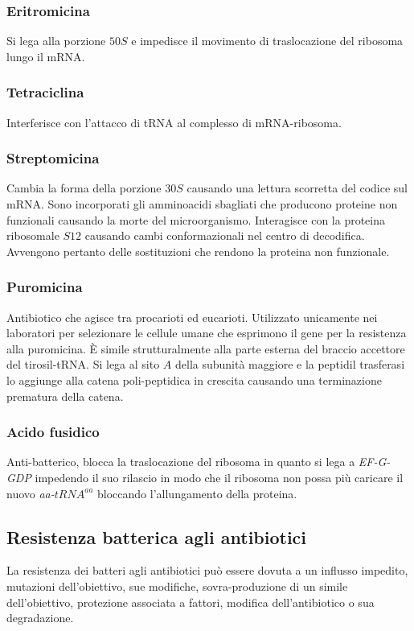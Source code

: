 \subsubsection{Eritromicina}
Si lega alla porzione $50S$ e impedisce il movimento di traslocazione del ribosoma lungo il mRNA.
\subsubsection{Tetraciclina}
Interferisce con l'attacco di tRNA al complesso di mRNA-ribosoma.
\subsubsection{Streptomicina}
Cambia la forma della porzione $30S$ causando una lettura scorretta del codice sul mRNA. Sono incorporati gli amminoacidi sbagliati che producono proteine non funzionali causando la morte
del microorganismo. Interagisce con la proteina ribosomale $S12$ causando cambi conformazionali nel centro di decodifica. Avvengono pertanto delle sostituzioni che rendono la proteina non funzionale.
\subsubsection{Puromicina}
Antibiotico che agisce tra procarioti ed eucarioti. Utilizzato unicamente nei laboratori per selezionare le cellule umane che esprimono il gene per la resistenza alla puromicina. \`E
simile strutturalmente alla parte esterna del braccio accettore del tirosil-tRNA. Si lega al sito $A$ della subunit\`a maggiore e la peptidil trasferasi lo aggiunge alla catena 
poli-peptidica in crescita causando una terminazione prematura della catena. 
\subsubsection{Acido fusidico}
Anti-batterico, blocca la traslocazione del ribosoma in quanto si lega a \emph{EF-G-GDP} impedendo il suo rilascio in modo che il ribosoma non possa pi\`u caricare il nuovo
\emph{aa-$tRNA^{aa}$} bloccando l'allungamento della proteina. 
\subsection{Resistenza batterica agli antibiotici}
La resistenza dei batteri agli antibiotici pu\`o essere dovuta a un influsso impedito, mutazioni dell'obiettivo, sue modifiche, sovra-produzione di un simile dell'obiettivo, protezione
associata a fattori, modifica dell'antibiotico o sua degradazione. 
